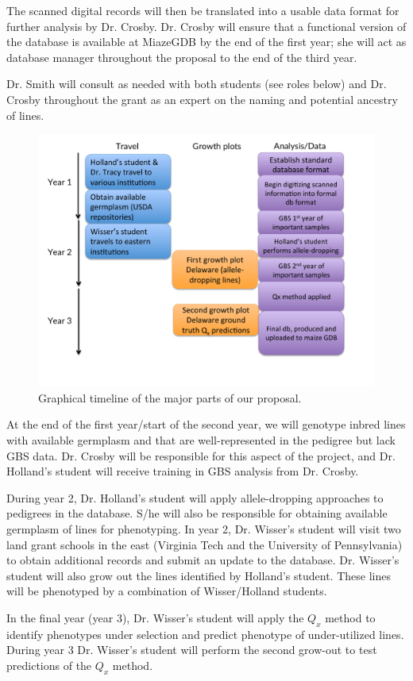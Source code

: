 \documentclass[12pt]{article}
\begin{document}
The scanned digital records will then be translated into a usable data format for further analysis by Dr. Crosby.  Dr. Crosby will ensure that a functional version of the database is available at MiazeGDB by the end of the first year; she will act as database manager throughout the proposal to the end of the third year.

Dr. Smith will consult as needed with both students (see roles below) and Dr. Crosby throughout the grant as an expert on the naming and potential ancestry of lines.

\begin{figure}
\centering
\includegraphics[width=0.7\linewidth]{timeline.pdf}
\caption{Graphical timeline of the major parts of our proposal.}
\label{fig:timeline}
\end{figure}

At the end of the first year/start of the second year, we will genotype inbred lines with available germplasm and that are well-represented in the pedigree but lack GBS data. 
Dr. Crosby will be responsible for this aspect of the project, and Dr. Holland's student will receive training in GBS analysis from Dr. Crosby. 

During year 2, Dr. Holland's student will apply allele-dropping approaches to pedigrees in the database. 
S/he will also be responsible for obtaining available germplasm of lines for phenotyping. 
In year 2, Dr. Wisser's student will visit two land grant schools in the east (Virginia Tech and the University of Pennsylvania) to obtain additional records and submit an update to the database. 
Dr. Wisser's student will also grow out the lines identified by Holland's student. 
These lines will be phenotyped by a combination of Wisser/Holland students.

In the final year (year 3), Dr. Wisser's student will apply the $Q_{x}$ method to identify phenotypes under selection and predict phenotype of under-utilized lines.
During year 3 Dr. Wisser's student will perform the second grow-out to test predictions of the $Q_{x}$ method.
\end{document}
